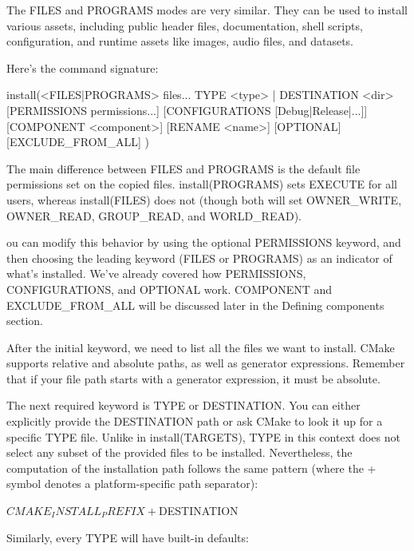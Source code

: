 
The FILES and PROGRAMS modes are very similar. They can be used to install various assets, including public header files, documentation, shell scripts, configuration, and runtime assets like images, audio files, and datasets.

Here’s the command signature:

\begin{shell}
install(<FILES|PROGRAMS> files...
        TYPE <type> | DESTINATION <dir>
        [PERMISSIONS permissions...]
        [CONFIGURATIONS [Debug|Release|...]]
        [COMPONENT <component>]
        [RENAME <name>] [OPTIONAL] [EXCLUDE_FROM_ALL]
)
\end{shell}

The main difference between FILES and PROGRAMS is the default file permissions set on the copied files. install(PROGRAMS) sets EXECUTE for all users, whereas install(FILES) does not (though both will set OWNER\_WRITE, OWNER\_READ, GROUP\_READ, and WORLD\_READ).

ou can modify this behavior by using the optional PERMISSIONS keyword, and then choosing the leading keyword (FILES or PROGRAMS) as an indicator of what’s installed. We’ve already covered how PERMISSIONS, CONFIGURATIONS, and OPTIONAL work. COMPONENT and EXCLUDE\_FROM\_ALL will be discussed later in the Defining components section.

After the initial keyword, we need to list all the files we want to install. CMake supports relative and absolute paths, as well as generator expressions. Remember that if your file path starts with a generator expression, it must be absolute.

The next required keyword is TYPE or DESTINATION. You can either explicitly provide the DESTINATION path or ask CMake to look it up for a specific TYPE file. Unlike in install(TARGETS), TYPE in this context does not select any subset of the provided files to be installed. Nevertheless, the computation of the installation path follows the same pattern (where the + symbol denotes a platform-specific path separator):

\begin{cmake}
${CMAKE_INSTALL_PREFIX} + ${DESTINATION}
\end{cmake}

Similarly, every TYPE will have built-in defaults:

